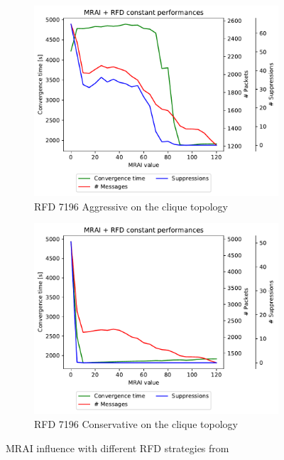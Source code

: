 \begin{figure}[h]
     \centering
     \begin{subfigure}[b]{0.48\textwidth}
         \centering
         \includegraphics[width=\textwidth]{images/RFD/clique/cisco_clique10_RFD_7196_aggressive-constant_mrai_rfd_evolution.pdf}
         \caption{RFD 7196 Aggressive on the clique topology}
         \label{fig:rfd7196aggressive}
     \end{subfigure}
     \hfill
     \begin{subfigure}[b]{0.48\textwidth}
         \centering
         \includegraphics[width=\textwidth]{images/RFD/clique/cisco_clique10_RFD_7196_conservative-constant_mrai_rfd_evolution.pdf}
         \caption{RFD 7196 Conservative on the clique topology}
         \label{fig:rfd7196conservative}
     \end{subfigure}
		\caption{MRAI influence with different RFD strategies from \cite{rfc7196}}
        \label{fig:clique_rfd7196}
\end{figure}

